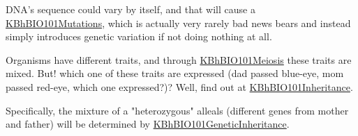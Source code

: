 \documentclass[letterpaper]{article}
\begin{document}
DNA's sequence could vary by itself, and that will cause a
\href{KBhBIO101Mutations.org}{KBhBIO101Mutations}, which is actually
very rarely bad news bears and instead simply introduces genetic
variation if not doing nothing at all.

Organisms have different traits, and through
\href{KBhBIO101Meiosis.org}{KBhBIO101Meiosis} these traits are mixed.
But! which one of these traits are expressed (dad passed blue-eye, mom
passed red-eye, which one expressed?)? Well, find out at
\href{KBhBIO101Inheritance.org}{KBhBIO101Inheritance}.

Specifically, the mixture of a "heterozygous" alleals (different genes
from mother and father) will be determined by
\href{KBhBIO101GeneticInheritance.org}{KBhBIO101GeneticInheritance}.
\end{document}
